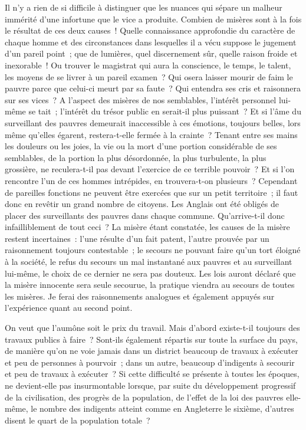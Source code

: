 \documentclass[french,twoside]{book} %
\begin{document}
Il n’y a rien de si difficile à distinguer que les nuances qui sépare un malheur immérité d’une infortune que le vice a produite. Combien de misères sont à la fois le résultat de ces deux causes ! Quelle connaissance approfondie du caractère de chaque homme et des circonstances dans lesquelles il a vécu suppose le jugement d’un pareil point ; que de lumières, quel discernement sûr, quelle raison froide et inexorable ! Ou trouver le magistrat qui aura la conscience, le temps, le talent, les moyens de se livrer à un pareil examen ? Qui osera laisser mourir de faim le pauvre parce que celui-ci meurt par sa faute ? Qui entendra ses cris et raisonnera sur ses vices ? A l’aspect des misères de nos semblables, l’intérêt personnel lui-même se tait ; l’intérêt du trésor public en serait-il plus puissant ? Et si l’âme du surveillant des pauvres demeurait inaccessible à ces émotions, toujours belles, lors même qu’elles égarent, restera-t-elle fermée à la crainte ? Tenant entre ses mains les douleurs ou les joies, la vie ou la mort d’une portion considérable de ses semblables, de la portion la plus désordonnée, la plus turbulente, la plus grossière, ne reculera-t-il pas devant l’exercice de ce terrible pouvoir ? Et si l’on rencontre l’un de ces hommes intrépides, en trouvera-t-on plusieurs ? Cependant de pareilles fonctions ne peuvent être exercées que sur un petit territoire ; il faut donc en revêtir un grand nombre de citoyens. Les Anglais ont été obligés de placer des surveillants des pauvres dans chaque commune. Qu'arrive-t-il donc infailliblement de tout ceci ? La misère étant constatée, les causes de la misère restent incertaines : l’une résulte d’un fait patent, l’autre prouvée par un raisonnement toujours contestable ; le secours ne pouvant faire qu’un tort éloigné à la société, le refus du secours un mal instantané aux pauvres et au surveillant lui-même, le choix de ce dernier ne sera pas douteux. Les lois auront déclaré que la misère innocente sera seule secourue, la pratique viendra au secours de toutes les misères. Je ferai des raisonnements analogues et également appuyés sur l’expérience quant au second point.\par
\bigbreak
\noindent On veut que l’aumône soit le prix du travail. Mais d’abord existe-t-il toujours des travaux publics à faire ? Sont-ils également répartis sur toute la surface du pays, de manière qu’on ne voie jamais dans un district beaucoup de travaux à exécuter et peu de personnes à pourvoir ; dans un autre, beaucoup d’indigents à secourir et peu de travaux à exécuter ? Si cette difficulté se présente à toutes les époques, ne devient-elle pas insurmontable lorsque, par suite du développement progressif de la civilisation, des progrès de la population, de l’effet de la loi des pauvres elle-même, le nombre des indigents atteint comme en Angleterre le sixième, d’autres disent le quart de la population totale ?\par
\end{document}
